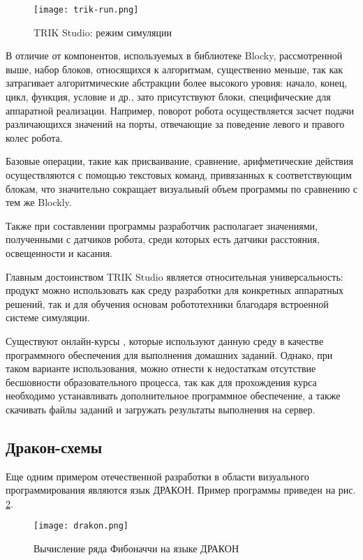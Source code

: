 \begin{figure}[htbp]
	\centering
	\texttt{[image: trik-run.png]}
	\caption{TRIK Studio: режим симуляции}%
	\label{fig:trik-run}
\end{figure}

В отличие от компонентов, используемых в библиотеке Blocky, рассмотренной выше, набор блоков, относящихся к алгоритмам, существенно меньше, так как затрагивает алгоритмические абстракции более высокого уровня: начало, конец, цикл, функция, условие и др., зато присутствуют блоки, специфические для аппаратной реализации. Например, поворот робота осуществляется засчет подачи различающихся значений на порты, отвечающие за поведение левого и правого колес робота.

Базовые операции, такие как присваивание, сравнение, арифметические действия осуществляются с помощью текстовых команд, привязанных к соответствующим блокам, что значительно сокращает визуальный объем программы по сравнению с тем же Blockly.

Также при составлении программы разработчик располагает значениями, полученными с датчиков робота, среди которых есть датчики расстояния, освещенности и касания.

Главным достоинством TRIK Studio является относительная универсальность: продукт можно использовать как среду разработки для конкретных аппаратных решений, так и для обучения основам робототехники благодаря встроенной системе симуляции.

Существуют онлайн-курсы \cite{stepik}, которые используют данную среду в качестве программного обеспечения для выполнения домашних заданий. Однако, при таком варианте использования, можно отнести к недостаткам отсутствие бесшовности образовательного процесса, так как для прохождения курса необходимо устанавливать дополнительное программное обеспечение, а также скачивать файлы заданий и загружать результаты выполнения на сервер.

\subsection{Дракон-схемы}

Еще одним примером отечественной разработки в области визуального программирования являются язык ДРАКОН. Пример программы приведен на рис. \ref{fig:drakon}.


\begin{figure}[htbp]
	\centering
	\texttt{[image: drakon.png]}
	\caption{Вычисление ряда Фибоначчи на языке ДРАКОН}%
	\label{fig:drakon}
\end{figure}

